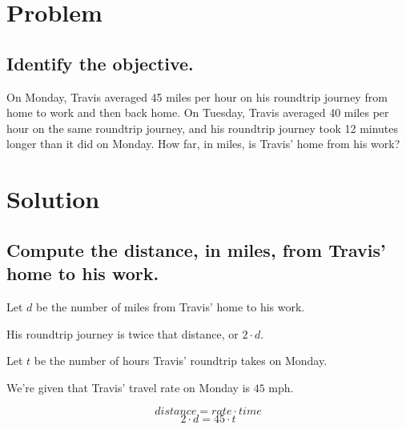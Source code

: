\documentclass{beamer} %
\begin{document}
\begin{frame} %
  \titlepage
\end{frame}

\section{Problem}

\subsection*{Identify the objective.}

\begin{frame}
  On Monday, Travis averaged 45 miles per hour on his roundtrip journey from home to work and then back home. On Tuesday, Travis averaged 40 miles per hour on the same roundtrip journey, and his roundtrip journey took 12 minutes longer than it did on Monday. How far, in miles, is Travis' home from his work?
\end{frame}

\section{Solution}

\subsection*{Compute the distance, in miles, from Travis' home to his work.}

\begin{frame}
  Let $d$ be the number of miles from Travis' home to his work. \pause

  His roundtrip journey is twice that distance, or $2\cdot d$. \pause

  Let $t$ be the number of hours Travis' roundtrip takes on Monday. \pause

  We're given that Travis' travel rate on Monday is $45$ mph. \pause

  \[distance = rate \cdot time\]
  \begin{equation}
    2\cdot d = 45\cdot t
  \end{equation}
\end{frame}

\setcounter{equation}{0} %
\end{document}
